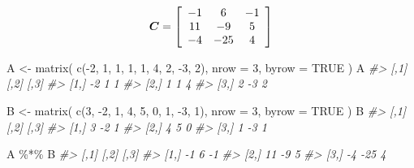 \documentclass[
  11pt,
]{krantz}
\makeatletter
\newenvironment{Shaded}{\begin{snugshade}}{\end{snugshade}}
\newcommand{\AttributeTok}[1]{\textcolor[rgb]{0.61,0.61,0.61}{#1}}
\newcommand{\CommentTok}[1]{\textcolor[rgb]{0.37,0.37,0.37}{\textit{#1}}}
\newcommand{\ConstantTok}[1]{\textcolor[rgb]{0,0,0}{#1}}
\newcommand{\DecValTok}[1]{\textcolor[rgb]{0.06,0.06,0.06}{#1}}
\newcommand{\FunctionTok}[1]{\textcolor[rgb]{0,0,0}{#1}}
\newcommand{\NormalTok}[1]{#1}
\newcommand{\OtherTok}[1]{\textcolor[rgb]{0.37,0.37,0.37}{#1}}
\newcommand{\SpecialCharTok}[1]{\textcolor[rgb]{0,0,0}{#1}}
\newenvironment{kframe}{%
\medskip{}
\setlength{\fboxsep}{.8em}
 \def\at@end@of@kframe{}%
 \ifinner\ifhmode%
  \def\at@end@of@kframe{\end{minipage}}%
  \begin{minipage}{\columnwidth}%
 \fi\fi%
 \def\FrameCommand##1{\hskip\@totalleftmargin \hskip-\fboxsep
 \colorbox{shadecolor}{##1}\hskip-\fboxsep
     \hskip-\linewidth \hskip-\@totalleftmargin \hskip\columnwidth}%
 \MakeFramed {\advance\hsize-\width
   \@totalleftmargin\z@ \linewidth\hsize
   \@setminipage}}%
 {\par\unskip\endMakeFramed%
 \at@end@of@kframe}
\renewenvironment{Shaded}{\begin{kframe}}{\end{kframe}}
\theoremstyle{definition}
\theoremstyle{definition}
\theoremstyle{definition}
\theoremstyle{definition}
\theoremstyle{remark}
\makeatother
\begin{document}
\[
\boldsymbol{C} =  \left[ \begin{array}{c c c}
-1 & 6 & -1\\
11 & -9 & 5\\
-4 & -25 & 4
\end{array}
 \right]
 \]

\begin{Shaded}
\begin{Highlighting}[]
\NormalTok{A }\OtherTok{\textless{}{-}} \FunctionTok{matrix}\NormalTok{(}
  \FunctionTok{c}\NormalTok{(}\SpecialCharTok{{-}}\DecValTok{2}\NormalTok{, }\DecValTok{1}\NormalTok{, }\DecValTok{1}\NormalTok{, }\DecValTok{1}\NormalTok{, }\DecValTok{1}\NormalTok{, }\DecValTok{4}\NormalTok{, }\DecValTok{2}\NormalTok{, }\SpecialCharTok{{-}}\DecValTok{3}\NormalTok{, }\DecValTok{2}\NormalTok{),}
  \AttributeTok{nrow =} \DecValTok{3}\NormalTok{,}
  \AttributeTok{byrow =} \ConstantTok{TRUE}
\NormalTok{)}
\NormalTok{A}
\CommentTok{\#\textgreater{}      [,1] [,2] [,3]}
\CommentTok{\#\textgreater{} [1,]   {-}2    1    1}
\CommentTok{\#\textgreater{} [2,]    1    1    4}
\CommentTok{\#\textgreater{} [3,]    2   {-}3    2}
\end{Highlighting}
\end{Shaded}

\begin{Shaded}
\begin{Highlighting}[]
\NormalTok{B }\OtherTok{\textless{}{-}} \FunctionTok{matrix}\NormalTok{(}
  \FunctionTok{c}\NormalTok{(}\DecValTok{3}\NormalTok{, }\SpecialCharTok{{-}}\DecValTok{2}\NormalTok{, }\DecValTok{1}\NormalTok{, }\DecValTok{4}\NormalTok{, }\DecValTok{5}\NormalTok{, }\DecValTok{0}\NormalTok{, }\DecValTok{1}\NormalTok{, }\SpecialCharTok{{-}}\DecValTok{3}\NormalTok{, }\DecValTok{1}\NormalTok{),}
  \AttributeTok{nrow =} \DecValTok{3}\NormalTok{,}
  \AttributeTok{byrow =} \ConstantTok{TRUE}
\NormalTok{)}
\NormalTok{B}
\CommentTok{\#\textgreater{}      [,1] [,2] [,3]}
\CommentTok{\#\textgreater{} [1,]    3   {-}2    1}
\CommentTok{\#\textgreater{} [2,]    4    5    0}
\CommentTok{\#\textgreater{} [3,]    1   {-}3    1}
\end{Highlighting}
\end{Shaded}

\begin{Shaded}
\begin{Highlighting}[]
\NormalTok{A }\SpecialCharTok{\%*\%}\NormalTok{ B}
\CommentTok{\#\textgreater{}      [,1] [,2] [,3]}
\CommentTok{\#\textgreater{} [1,]   {-}1    6   {-}1}
\CommentTok{\#\textgreater{} [2,]   11   {-}9    5}
\CommentTok{\#\textgreater{} [3,]   {-}4  {-}25    4}
\end{Highlighting}
\end{Shaded}
\end{document}
